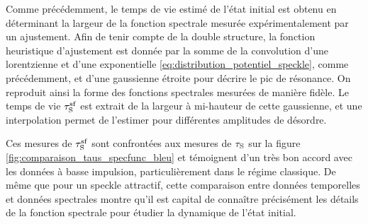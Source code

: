 Comme précédemment, le temps de vie estimé de l'état initial est obtenu en déterminant la largeur de la fonction spectrale mesurée expérimentalement par un ajustement. Afin de tenir compte de la double structure, la fonction heuristique d'ajustement est donnée par la somme de la convolution d'une lorentzienne et d'une exponentielle \ref{eq:distribution_potentiel_speckle}, comme précédemment, et d'une gaussienne étroite pour décrire le pic de résonance. On reproduit ainsi la forme des fonctions spectrales mesurées de manière fidèle. Le temps de vie $\tau_{\mathrm{S}}^{\mathrm{sf}}$ est extrait de la largeur à mi-hauteur de cette gaussienne, et une interpolation permet de l'estimer pour différentes amplitudes de désordre. 

Ces mesures de $\tau_{\mathrm{S}}^{\mathrm{sf}}$ sont confrontées aux mesures de $\tau_{\mathrm{S}}$ sur la figure \ref{fig:comparaison_taus_specfunc_bleu} et témoignent d'un très bon accord avec les données à basse impulsion, particulièrement dans le régime classique. De même que pour un speckle attractif, cette comparaison entre données temporelles et données spectrales montre qu'il est capital de connaître précisément les détails de la fonction spectrale pour étudier la dynamique de l'état initial.




